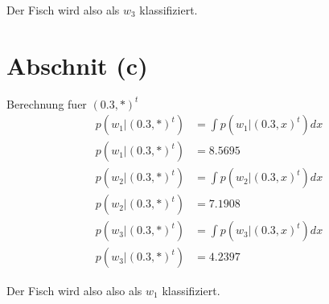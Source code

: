 \documentclass[12pt]{article}
\begin{document}
Der Fisch wird also als $w_3$ klassifiziert.

\section{Abschnit (c)}

Berechnung fuer $(0.3,*)^t$
  \begin{align}
    p(w_1|(0.3,*)^t) &=\int p(w_1|(0.3,x)^t) dx\\
    p(w_1|(0.3,*)^t) &= 8.5695
  \end{align}
  \begin{align}
    p(w_2|(0.3,*)^t) &=\int p(w_2|(0.3,x)^t) dx\\
    p(w_2|(0.3,*)^t) &= 7.1908
  \end{align}
  \begin{align}
    p(w_3|(0.3,*)^t) &=\int p(w_3|(0.3,x)^t) dx\\
    p(w_3|(0.3,*)^t) &= 4.2397
  \end{align}

Der Fisch wird also also als $w_1$ klassifiziert.
\end{document}

